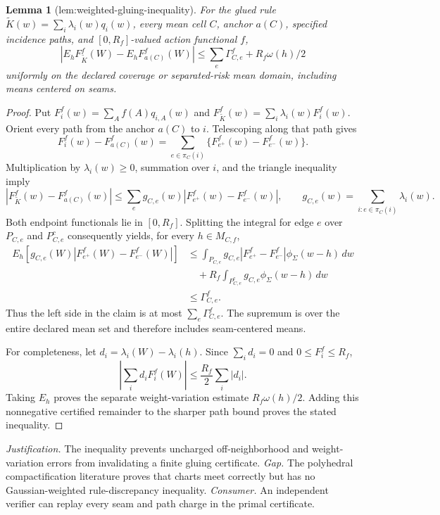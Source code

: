 \documentclass{article}
\newtheorem{lemma}{Lemma}
\begin{document}
\begin{lemma}[lem:weighted-gluing-inequality]\label{lem:weighted-gluing-inequality}
For the glued rule \(\widetilde K(w)=\sum_i\lambda_i(w)q_i(w)\), every mean cell \(C\), anchor \(a(C)\), specified incidence paths, and \([0,R_f]\)-valued action functional \(f\), \[|E_hF_{\widetilde K}^{f}(W)-E_hF_{a(C)}^{f}(W)|\le\sum_e\Gamma_{C,e}^{f}+R_f\omega(h)/2\] uniformly on the declared coverage or separated-risk mean domain, including means centered on seams.
\end{lemma}
\begin{proof}
Put \(F_i^f(w)=\sum_A f(A)q_{i,A}(w)\) and \(F_{\widetilde K}^f(w)=\sum_i\lambda_i(w)F_i^f(w)\). Orient every path from the anchor \(a(C)\) to \(i\). Telescoping along that path gives
\[
 F_i^f(w)-F_{a(C)}^f(w)
 =\sum_{e\in\pi_C(i)}\{F_{e^+}^f(w)-F_{e^-}^f(w)\}.
\]
Multiplication by \(\lambda_i(w)\ge0\), summation over \(i\), and the triangle inequality imply
\[
 |F_{\widetilde K}^f(w)-F_{a(C)}^f(w)|
 \le \sum_e g_{C,e}(w)|F_{e^+}^f(w)-F_{e^-}^f(w)|,
 \qquad
 g_{C,e}(w)=\sum_{i:e\in\pi_C(i)}\lambda_i(w).
\]
Both endpoint functionals lie in \([0,R_f]\). Splitting the integral for edge \(e\) over \(P_{C,e}\) and \(P_{C,e}^c\) consequently yields, for every \(h\in M_{C,f}\),
\[
 \begin{split}
 E_h\!\left[g_{C,e}(W)|F_{e^+}^f(W)-F_{e^-}^f(W)|\right]
 &\le \int_{P_{C,e}}g_{C,e}|F_{e^+}^f-F_{e^-}^f|\phi_\Sigma(w-h)\,dw\\
 &\quad+R_f\int_{P_{C,e}^c}g_{C,e}\phi_\Sigma(w-h)\,dw\\
 &\le \Gamma_{C,e}^f.
 \end{split}
\]
Thus the left side in the claim is at most \(\sum_e\Gamma_{C,e}^f\). The supremum is over the entire declared mean set and therefore includes seam-centered means.

For completeness, let \(d_i=\lambda_i(W)-\lambda_i(h)\). Since \(\sum_i d_i=0\) and \(0\le F_i^f\le R_f\),
\[
 \left|\sum_i d_iF_i^f(W)\right|
 \le \frac{R_f}{2}\sum_i|d_i|.
\]
Taking \(E_h\) proves the separate weight-variation estimate \(R_f\omega(h)/2\). Adding this nonnegative certified remainder to the sharper path bound proves the stated inequality.
\end{proof}
\par\smallskip\noindent \textit{Justification.} The inequality prevents uncharged off-neighborhood and weight-variation errors from invalidating a finite gluing certificate. \textit{Gap.} The polyhedral compactification literature proves that charts meet correctly but has no Gaussian-weighted rule-discrepancy inequality. \textit{Consumer.} An independent verifier can replay every seam and path charge in the primal certificate.
\end{document}
